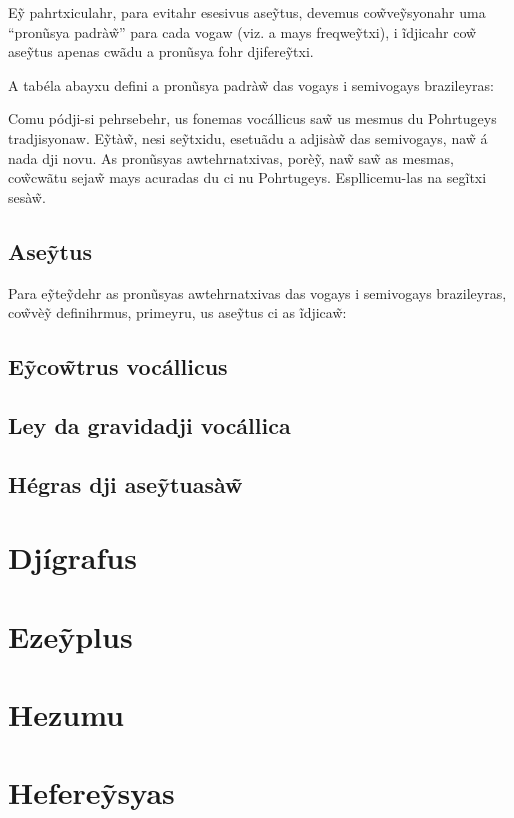 \documentclass[12pt, a5paper, titlepage]{article}
\begin{document}
\begin{bilingualpages}
    E\~y pahrtxiculahr, para evitahr esesivus ase\~ytus, devemus co\~wve\~ysyonahr
    uma ``pronũsya padrà\~w'' para cada vogaw (viz. a mays freqwe\~ytxi), i
    ĩdjicahr co\~w ase\~ytus apenas cwãdu a pronũsya fohr djifere\~ytxi.

    A tabéla abayxu defini a pronũsya padrà\~w das vogays i semivogays brazileyras:

    \BrTableVowels

    Comu pódji-si pehrsebehr, us fonemas vocállicus sa\~w us mesmus du Pohrtugeys
    tradjisyonaw. E\~ytà\~w, nesi se\~ytxidu, esetuãdu a adjisà\~w das semivogays,
    na\~w á nada dji novu. As pronũsyas awtehrnatxivas, porè\~y, na\~w sa\~w as
    mesmas, co\~wcwãtu seja\~w mays acuradas du ci nu Pohrtugeys. Espllicemu-las na
    segĩtxi sesà\~w.

    \subsection{Ase\~ytus}
    Para e\~yte\~ydehr as pronũsyas awtehrnatxivas das vogays i semivogays
    brazileyras, co\~wvè\~y definihrmus, primeyru, us ase\~ytus ci as ĩdjica\~w:

    \BrTableDiacritics

    \subsection{E\~yco\~wtrus vocállicus}
    \subsection{Ley da gravidadji vocállica}
    \subsection{Hégras dji ase\~ytuasà\~w}

    \section{Djígrafus}

    \BrTableDigraphs

    \section{Eze\~yplus}

\end{bilingualpages}

\newpage
\section{Hezumu}

\newpage
\section{Hefere\~ysyas}
\end{document}
